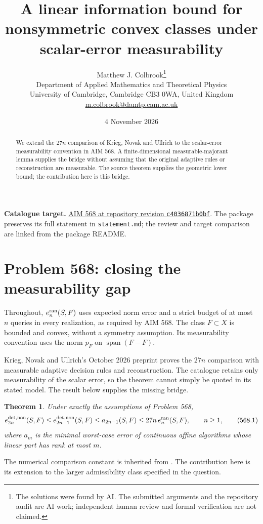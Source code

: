 \documentclass[11pt,a4paper]{article}
\title{A linear information bound for nonsymmetric convex classes under scalar-error measurability}
\author{Matthew J. Colbrook\thanks{The solutions were found by AI. The submitted arguments and the repository audit are AI work; independent human review and formal verification are not claimed.}\\[4pt]
\small Department of Applied Mathematics and Theoretical Physics\\
\small University of Cambridge, Cambridge CB3 0WA, United Kingdom\\
\small\href{mailto:m.colbrook@damtp.cam.ac.uk}{m.colbrook@damtp.cam.ac.uk}}
\date{4 November 2026}
\newtheorem{theorem}{Theorem}[section]
\theoremstyle{definition}
\theoremstyle{remark}
\numberwithin{equation}{section}
\begin{document}
\maketitle
\begin{abstract}
We extend the $27n$ comparison of Krieg, Novak and Ullrich to the scalar-error measurability convention in AIM 568. A finite-dimensional measurable-majorant lemma supplies the bridge without assuming that the original adaptive rules or reconstruction are measurable. The source theorem supplies the geometric lower bound; the contribution here is this bridge.
\end{abstract}
\noindent\textbf{Catalogue target.} \href{https://github.com/MColbrook/AIM/blob/c4036871b0bf15cbc83e79c780b7191bcbb2cfed/problems/568-a-linear-information-bound-for-arbitrary-convex-model-classes.md}{AIM 568 at repository revision \texttt{c4036871b0bf}}. The package preserves its full statement in \texttt{statement.md}; the review and target comparison are linked from the package README.
\medskip

\section{Problem 568: closing the measurability gap}
\label{sec:568}

Throughout, \(e_n^{\rm ran}(S,F)\) uses expected norm error and a strict
budget of at most \(n\) queries in every realization, as required by AIM 568.
The class \(F\subset X\) is bounded and convex, without a symmetry
assumption. Its measurability convention uses the norm
\(p_F\) on \(\operatorname{span}(F-F)\).

Krieg, Novak and Ullrich's October 2026 preprint
\cite{knu2026} proves the \(27n\) comparison with measurable adaptive
decision rules and reconstruction. The catalogue retains only
measurability of the scalar error, so the theorem cannot simply be
quoted in its stated model. The result below supplies the missing
bridge.

\begin{theorem}
\label{thm:568}
Under exactly the assumptions of Problem 568,
\[
 e_{2n}^{\rm det,non}(S,F)
 \le e_{2n-1}^{\rm det,non}(S,F)
 \le a_{2n-1}(S,F)
 \le 27n\,e_n^{\rm ran}(S,F),\qquad n\ge1,
 \tag{568.1}
\]
where \(a_m\) is the minimal worst-case error of continuous affine
algorithms whose linear part has rank at most \(m\).
\end{theorem}

The numerical comparison constant is inherited from
\cite{knu2026}. The contribution here is its extension to the larger
admissibility class specified in the question.
\end{document}
